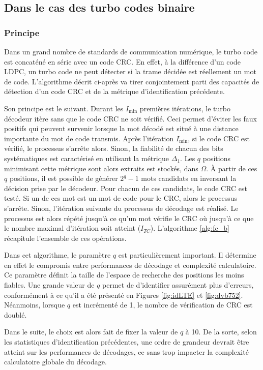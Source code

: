 \subsection{Dans le cas des turbo codes binaire}

\subsubsection{Principe}
Dans un grand nombre de standards de communication numérique, le turbo code est concaténé en série avec un code CRC. En 
effet, à la différence d'un code LDPC, un turbo code ne peut détecter si la trame décidée est réellement un mot de code. 
L'algorithme  décrit ci-après va tirer conjointement parti des capacités de détection d'un code CRC et de la métrique 
d'identification précédente. 

Son principe est le suivant. Durant les $I_{\text{min}}$ premières itérations, le turbo décodeur itère sans que le code
CRC ne soit vérifié. Ceci permet d'éviter les faux positifs qui peuvent survenir lorsque la mot décodé est situé à une 
distance importante du mot de code transmis. Après l'itération $I_{\text{min}}$, si le code CRC est vérifié, le processus
s'arrête alors. Sinon, la fiabilité de chacun des bits systématiques est caractérisé en utilisant la métrique $\Delta_1$.
Les $q$ positions minimisant cette métrique sont alors extraits est stockés, dans $\Omega$. À partir de ces $q$ positions,
il est possible de générer $2^q-1$ mots candidats en inversant la décision prise par le décodeur. Pour chacun de ces 
candidats, le code CRC est testé. Si un de ces mot est un mot de code pour le CRC, alors le processus s'arrête. Sinon, 
l'itération suivante du processus de décodage est réalisé. Le processus est alors répété jusqu'à ce qu'un mot vérifie le 
CRC où jusqu'à ce que le nombre maximal d'itération soit atteint ($I_{TC}$). L'algorithme \ref{alg:fc_b} récapitule l'ensemble de 
ces opérations.

Dans cet algorithme, le paramètre $q$ est particulièrement important. Il détermine en effet le compromis entre performances
de décodage et complexité calculatoire. Ce paramètre définit la taille de l'espace de recherche des positions les moins
fiables. Une grande valeur de $q$ permet de d'identifier assurément plus d'erreurs, conformément à ce qu'il a été
présenté en Figures \ref{fig:idLTE} et \ref{fig:dvb752}. Néanmoins, lorsque $q$ est incrémenté de 1, le nombre de 
vérification de CRC est doublé.

Dans le suite, le choix est alors fait de fixer la valeur de $q$ à 10. De la sorte, selon les statistiques d'identification 
précédentes, une ordre de grandeur devrait être atteint sur les performances de décodages, ce sans trop impacter la complexité
calculatoire globale du décodage.

